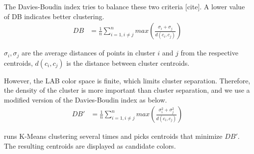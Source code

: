 The Davies-Boudin index tries to balance these two criteria [cite].  A lower value of DB indicates better clustering.
\begin{align}
DB &= \frac{1}{n} \sum_{i=1, i \neq j}^{n}max\left(\frac{\sigma_{i} + \sigma_{j}}{d(c_{i}, c_{j})}\right)
\end{align}

$\sigma_{i}, \sigma_{j}$ are the average distances of points in cluster $i$ and $j$ from the respective centroids, $d(c_{i}, c_{j})$ is the distance between cluster centroids.

However, the LAB color space is finite, which limits cluster separation. Therefore, the density of the cluster is more important than cluster separation, and we use a modified version of the Davies-Boudin index as below.
\begin{align}
DB' &= \frac{1}{n} \sum_{i=1, i \neq j}^{n}max\left(\frac{\sigma_{i}^{2} + \sigma_{j}^{2}}{d(c_{i}, c_{j})}\right)
\end{align}

\system runs K-Means clustering several times and picks centroids that minimize $DB'$. The resulting centroids are displayed as candidate colors.